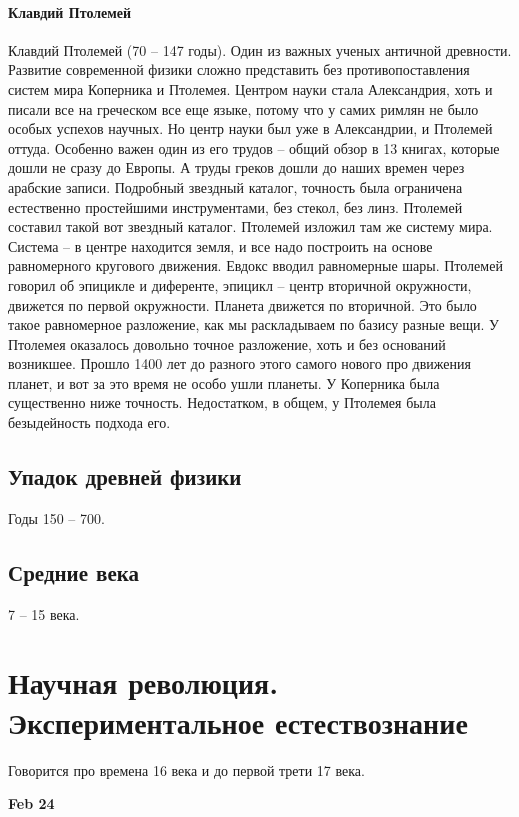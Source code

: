 \documentclass[a4paper, 12pt]{article}
\begin{document}
\paragraph{Клавдий Птолемей}
Клавдий Птолемей (70 -- 147 годы). Один из важных ученых античной 
древности. Развитие современной физики сложно представить без 
противопоставления систем мира Коперника и Птолемея. Центром науки стала 
Александрия, хоть и писали все на греческом все еще языке, потому что 
у самих римлян не было особых успехов научных. Но центр науки был уже 
в Александрии, и Птолемей оттуда. Особенно важен один из его трудов -- 
общий обзор в 13 книгах, которые дошли не сразу до Европы. А труды 
греков дошли до наших времен через арабские записи. Подробный звездный 
каталог, точность была ограничена естественно простейшими инструментами, 
без стекол, без линз. Птолемей составил такой вот звездный каталог. 
Птолемей изложил там же систему мира. Система -- в центре находится 
земля, и все надо построить на основе равномерного кругового движения. 
Евдокс вводил равномерные шары. Птолемей говорил об эпицикле 
и диференте, эпицикл -- центр вторичной окружности, движется по первой 
окружности. Планета движется по вторичной. Это было такое равномерное 
разложение, как мы раскладываем по базису разные вещи. У Птолемея 
оказалось довольно точное разложение, хоть и без оснований возникшее. 
Прошло 1400 лет до разного этого самого нового про движения планет, 
и вот за это время не особо ушли планеты. У Коперника была существенно 
ниже точность. Недостатком, в общем, у Птолемея была безыдейность 
подхода его.

\subsection{Упадок древней физики}
Годы 150 -- 700.

\subsection{Средние века}
7 -- 15 века.


\section{Научная революция. Экспериментальное естествознание}

Говорится про времена 16 века и до первой трети 17 века.

\hfill\textbf{Feb 24}
\end{document}
